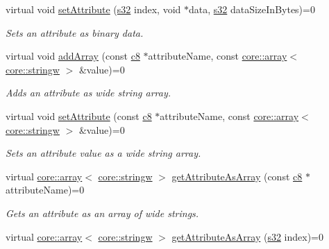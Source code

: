 \begin{DoxyCompactItemize}
virtual void \hyperlink{classirr_1_1io_1_1IAttributes_a26d06e1f7da14ce1bfb7b84c0b22dd64}{set\+Attribute} (\hyperlink{namespaceirr_ac66849b7a6ed16e30ebede579f9b47c6}{s32} index, void $\ast$data, \hyperlink{namespaceirr_ac66849b7a6ed16e30ebede579f9b47c6}{s32} data\+Size\+In\+Bytes)=0
\begin{DoxyCompactList}\small\item\em Sets an attribute as binary data. \end{DoxyCompactList}\item 
\mbox{\label{classirr_1_1io_1_1IAttributes_abbf204e53ef70b89fc25a98f01111031}} 
virtual void \hyperlink{classirr_1_1io_1_1IAttributes_abbf204e53ef70b89fc25a98f01111031}{add\+Array} (const \hyperlink{namespaceirr_a9395eaea339bcb546b319e9c96bf7410}{c8} $\ast$attribute\+Name, const \hyperlink{classirr_1_1core_1_1array}{core\+::array}$<$ \hyperlink{namespaceirr_1_1core_aef83fafbb1b36fcce44c07c9be23a7f2}{core\+::stringw} $>$ \&value)=0
\begin{DoxyCompactList}\small\item\em Adds an attribute as wide string array. \end{DoxyCompactList}\item 
virtual void \hyperlink{classirr_1_1io_1_1IAttributes_a95abee2c34c3a438ba0df22d339b806e}{set\+Attribute} (const \hyperlink{namespaceirr_a9395eaea339bcb546b319e9c96bf7410}{c8} $\ast$attribute\+Name, const \hyperlink{classirr_1_1core_1_1array}{core\+::array}$<$ \hyperlink{namespaceirr_1_1core_aef83fafbb1b36fcce44c07c9be23a7f2}{core\+::stringw} $>$ \&value)=0
\begin{DoxyCompactList}\small\item\em Sets an attribute value as a wide string array. \end{DoxyCompactList}\item 
virtual \hyperlink{classirr_1_1core_1_1array}{core\+::array}$<$ \hyperlink{namespaceirr_1_1core_aef83fafbb1b36fcce44c07c9be23a7f2}{core\+::stringw} $>$ \hyperlink{classirr_1_1io_1_1IAttributes_af4fb7e071a70bc0e9c57099bc04eda4f}{get\+Attribute\+As\+Array} (const \hyperlink{namespaceirr_a9395eaea339bcb546b319e9c96bf7410}{c8} $\ast$attribute\+Name)=0
\begin{DoxyCompactList}\small\item\em Gets an attribute as an array of wide strings. \end{DoxyCompactList}\item 
virtual \hyperlink{classirr_1_1core_1_1array}{core\+::array}$<$ \hyperlink{namespaceirr_1_1core_aef83fafbb1b36fcce44c07c9be23a7f2}{core\+::stringw} $>$ \hyperlink{classirr_1_1io_1_1IAttributes_a78e6562bd6e45c24d10c8cf77e3b317a}{get\+Attribute\+As\+Array} (\hyperlink{namespaceirr_ac66849b7a6ed16e30ebede579f9b47c6}{s32} index)=0

\end{DoxyCompactItemize}

